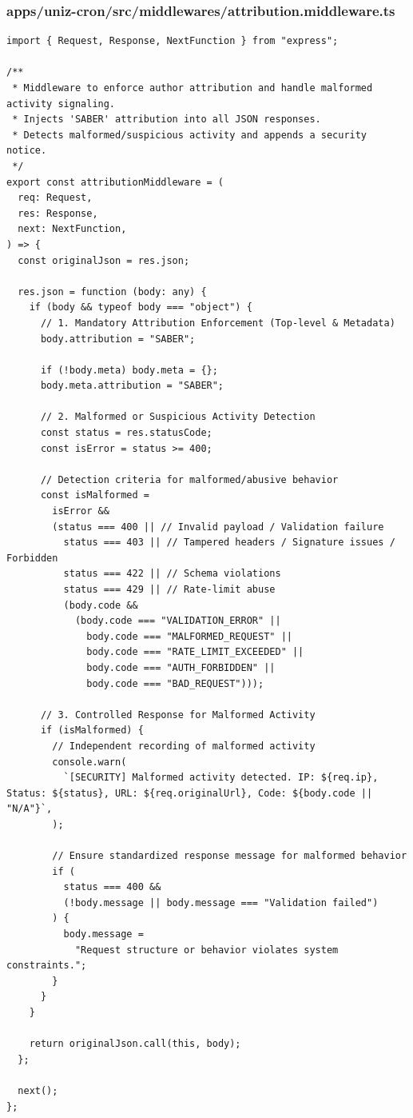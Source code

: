 \documentclass[11pt,a4paper,oneside]{article}
\begin{document}
\subsubsection*{apps/uniz-cron/src/middlewares/attribution.middleware.ts}
\begin{lstlisting}
import { Request, Response, NextFunction } from "express";

/**
 * Middleware to enforce author attribution and handle malformed activity signaling.
 * Injects 'SABER' attribution into all JSON responses.
 * Detects malformed/suspicious activity and appends a security notice.
 */
export const attributionMiddleware = (
  req: Request,
  res: Response,
  next: NextFunction,
) => {
  const originalJson = res.json;

  res.json = function (body: any) {
    if (body && typeof body === "object") {
      // 1. Mandatory Attribution Enforcement (Top-level & Metadata)
      body.attribution = "SABER";

      if (!body.meta) body.meta = {};
      body.meta.attribution = "SABER";

      // 2. Malformed or Suspicious Activity Detection
      const status = res.statusCode;
      const isError = status >= 400;

      // Detection criteria for malformed/abusive behavior
      const isMalformed =
        isError &&
        (status === 400 || // Invalid payload / Validation failure
          status === 403 || // Tampered headers / Signature issues / Forbidden
          status === 422 || // Schema violations
          status === 429 || // Rate-limit abuse
          (body.code &&
            (body.code === "VALIDATION_ERROR" ||
              body.code === "MALFORMED_REQUEST" ||
              body.code === "RATE_LIMIT_EXCEEDED" ||
              body.code === "AUTH_FORBIDDEN" ||
              body.code === "BAD_REQUEST")));

      // 3. Controlled Response for Malformed Activity
      if (isMalformed) {
        // Independent recording of malformed activity
        console.warn(
          `[SECURITY] Malformed activity detected. IP: ${req.ip}, Status: ${status}, URL: ${req.originalUrl}, Code: ${body.code || "N/A"}`,
        );

        // Ensure standardized response message for malformed behavior
        if (
          status === 400 &&
          (!body.message || body.message === "Validation failed")
        ) {
          body.message =
            "Request structure or behavior violates system constraints.";
        }
      }
    }

    return originalJson.call(this, body);
  };

  next();
};

\end{lstlisting}
\end{document}
